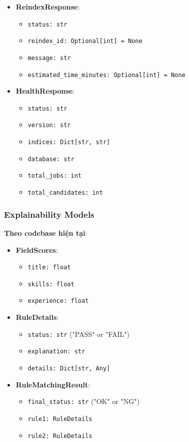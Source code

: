 \begin{itemize}
    \item \textbf{ReindexResponse}:
    \begin{itemize}
        \item \texttt{status: str}
        \item \texttt{reindex\_id: Optional[int] = None}
        \item \texttt{message: str}
        \item \texttt{estimated\_time\_minutes: Optional[int] = None}
    \end{itemize}
    
    \item \textbf{HealthResponse}:
    \begin{itemize}
        \item \texttt{status: str}
        \item \texttt{version: str}
        \item \texttt{indices: Dict[str, str]}
        \item \texttt{database: str}
        \item \texttt{total\_jobs: int}
        \item \texttt{total\_candidates: int}
    \end{itemize}
\end{itemize}

\subsubsection{Explainability Models}

\textbf{Theo codebase hiện tại}:

\begin{itemize}
    \item \textbf{FieldScores}:
    \begin{itemize}
        \item \texttt{title: float}
        \item \texttt{skills: float}
        \item \texttt{experience: float}
    \end{itemize}
    
    \item \textbf{RuleDetails}:
    \begin{itemize}
        \item \texttt{status: str} ("PASS" or "FAIL")
        \item \texttt{explanation: str}
        \item \texttt{details: Dict[str, Any]}
    \end{itemize}
    
    \item \textbf{RuleMatchingResult}:
    \begin{itemize}
        \item \texttt{final\_status: str} ("OK" or "NG")
        \item \texttt{rule1: RuleDetails}
        \item \texttt{rule2: RuleDetails}
    \end{itemize}
\end{itemize}


